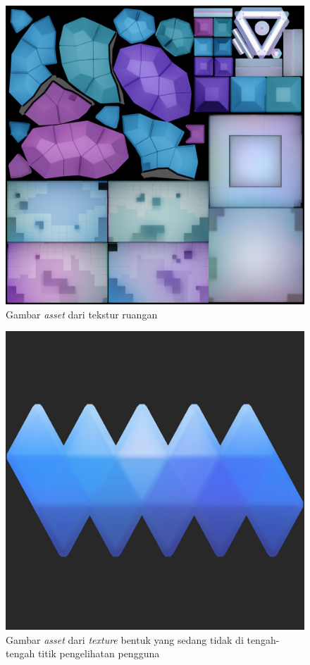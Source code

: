 \begin{figure}[h]
	\centering
		\includegraphics[scale=0.2]{Gambar/room.png}
	\caption{Gambar \textit{asset} dari tekstur ruangan}
	\label{fig:vr-room}
\end{figure}

\begin{figure}[h]
	\centering
		\includegraphics[scale=0.4]{Gambar/shape_blue.png}
	\caption{Gambar \textit{asset} dari \textit{texture} bentuk yang sedang tidak di tengah-tengah titik pengelihatan pengguna}
	\label{fig:blue-shape}
\end{figure}

